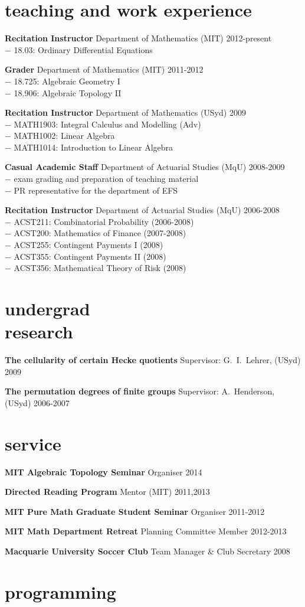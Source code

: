 \documentclass[margin,line]{resume}
\newcommand{\CVsection}[1]{\section{\mysidestyle #1}}
\newcommand{\entry}[3]{\textbf{#1} #2 \hfill {#3}
           
\vspace{-2.7mm}}
\newcommand{\twolineentry}[4]{\textbf{#1} #2 \hfill {#4}\\%
#3
           
\vspace{-2.7mm}}
\newcommand{\FINALentry}[3]{\textbf{#1} #2 \hfill {#3}}
\newcommand{\FINALtwolineentry}[4]{\textbf{#1} #2 \hfill {#4}\\%
#3}
\begin{document}
\begin{resume}
\CVsection{teaching and work experience}

\twolineentry{Recitation Instructor}{Department of Mathematics (MIT)}{\phantom{space}$-$ 18.03: Ordinary Differential Equations}{2012-present}
\twolineentry{Grader}{Department of Mathematics (MIT)}{%
\phantom{space}$-$ 18.725: Algebraic Geometry I\\
\phantom{space}$-$ 18.906: Algebraic Topology II%
}{2011-2012}
\twolineentry{Recitation Instructor}{Department of Mathematics (USyd)}{%
\phantom{space}$-$ MATH1903: Integral Calculus and Modelling (Adv)\\
\phantom{space}$-$ MATH1002: Linear Algebra\\
\phantom{space}$-$ MATH1014: Introduction to Linear Algebra%
}{2009}
\twolineentry{Casual Academic Staff}{Department of Actuarial Studies (MqU)}{%
\phantom{space}$-$ exam grading and preparation of teaching material\\
\phantom{space}$-$ PR representative for the department of EFS%
}{2008-2009}
\FINALtwolineentry{Recitation Instructor}{Department of Actuarial Studies (MqU)}{%
\phantom{space}$-$ ACST211: Combinatorial Probability (2006-2008)\\
\phantom{space}$-$ ACST200: Mathematics of Finance (2007-2008)\\
\phantom{space}$-$ ACST255: Contingent Payments I (2008)\\
\phantom{space}$-$ ACST355: Contingent Payments II (2008)\\
\phantom{space}$-$ ACST356: Mathematical Theory of Risk (2008)%
}{2006-2008}


\CVsection{undergrad \\ research}

\entry{The cellularity of certain Hecke quotients}{Supervisor: G.\ I.\ Lehrer, (USyd)}{2009}
\FINALentry{The permutation degrees of finite groups}{Supervisor: A.\ Henderson, (USyd)}{2006-2007}


\CVsection{service}

\entry{MIT Algebraic Topology Seminar}{Organiser}{2014}
\entry{Directed Reading Program}{Mentor (MIT)}{2011,2013}
\entry{MIT Pure Math Graduate Student Seminar}{Organiser}{2011-2012}
\entry{MIT Math Department Retreat}{Planning Committee Member}{2012-2013}
\FINALentry{Macquarie University Soccer Club}{Team Manager \& Club Secretary}{2008}


\CVsection{programming}


\end{resume}
\end{document}
